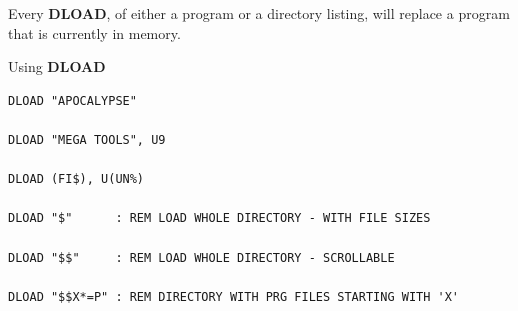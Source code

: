 \begin{description}[leftmargin=2cm,style=nextline]
                  Every {\bf DLOAD}, of either a program or a directory listing, will replace a program that is currently in memory.

\item [Examples:] Using {\bf DLOAD}

\begin{tcolorbox}[colback=black,coltext=white]
\verbatimfont{\codefont}
\begin{verbatim}
DLOAD "APOCALYPSE"

DLOAD "MEGA TOOLS", U9

DLOAD (FI$), U(UN%)

DLOAD "$"      : REM LOAD WHOLE DIRECTORY - WITH FILE SIZES

DLOAD "$$"     : REM LOAD WHOLE DIRECTORY - SCROLLABLE

DLOAD "$$X*=P" : REM DIRECTORY WITH PRG FILES STARTING WITH 'X'
\end{verbatim}
\end{tcolorbox}
\end{description}


\newpage
